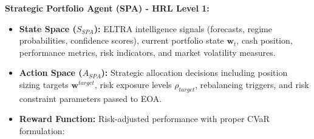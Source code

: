 \documentclass[11pt,a4paper]{article}
\begin{document}
\textbf{Strategic Portfolio Agent (SPA) - HRL Level 1:}

\begin{itemize}
\item   \textbf{State Space ($S_{SPA}$):} ELTRA intelligence signals (forecasts, regime probabilities, confidence scores), current portfolio state $\mathbf{w}_t$, cash position, performance metrics, risk indicators, and market volatility measures.

\item   \textbf{Action Space ($A_{SPA}$):} Strategic allocation decisions including position sizing targets $\mathbf{w}^{target}$, risk exposure levels $\rho_{target}$, rebalancing triggers, and risk constraint parameters passed to EOA.

\item   \textbf{Reward Function:} Risk-adjusted performance with proper CVaR formulation:
\end{itemize}
\end{document}
